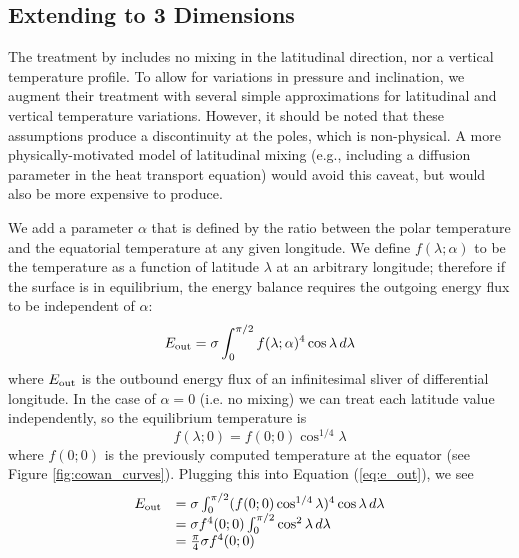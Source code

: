 \documentclass[linenumbers,5p,twocolumn,authoryear]{elsarticle}
\begin{document}
\subsection{Extending to 3 Dimensions}

The treatment by \citet{cowan2011} includes no mixing in the latitudinal direction, nor a vertical temperature profile. To allow for variations in pressure and inclination, we augment their treatment with several simple approximations for latitudinal and vertical temperature variations. However, it should be noted that these assumptions produce a discontinuity at the poles, which is non-physical. A more physically-motivated model of latitudinal mixing (e.g., including a diffusion parameter in the heat transport equation) would avoid this caveat, but would also be more expensive to produce.

We add a parameter $\alpha$ that is defined by the ratio between the polar temperature and the equatorial temperature at any given longitude. We define $f(\lambda;\alpha)$ to be the temperature as a function of latitude $\lambda$ at an arbitrary longitude; therefore if the surface is in equilibrium, the energy balance requires the outgoing energy flux to be independent of $\alpha$:
\begin{equation}
    \label{eq:e_out}
    E_{\rm out} = \sigma \int_0^{\pi/2} f(\lambda; \alpha)^4 \cos{\lambda}\,d\lambda
\end{equation}
where $E_{\rm out}$ is the outbound energy flux of an infinitesimal sliver of differential longitude. In the case of $\alpha=0$ (i.e. no mixing) we can treat each latitude value independently, so the equilibrium temperature is
\begin{equation}
    f(\lambda; 0) = f(0;0) \cos^{1/4}{\lambda}
\end{equation}
where $f(0;0)$ is the previously computed temperature at the equator (see Figure \ref{fig:cowan_curves}). Plugging this into Equation (\ref{eq:e_out}), we see
\begin{equation}
    \label{eq:nomix}
    \begin{array}{cl}
        E_{\rm out} & = \sigma \int_0^{\pi/2} (f(0;0) \cos^{1/4}{\lambda})^4\cos{\lambda}\,d\lambda \\
        & = \sigma f^4(0;0) \int_0^{\pi/2} \cos^{2}{\lambda}\,d\lambda \\
        & = \frac{\pi}{4}\sigma f^4(0;0)
    \end{array}
\end{equation}
\end{document}
